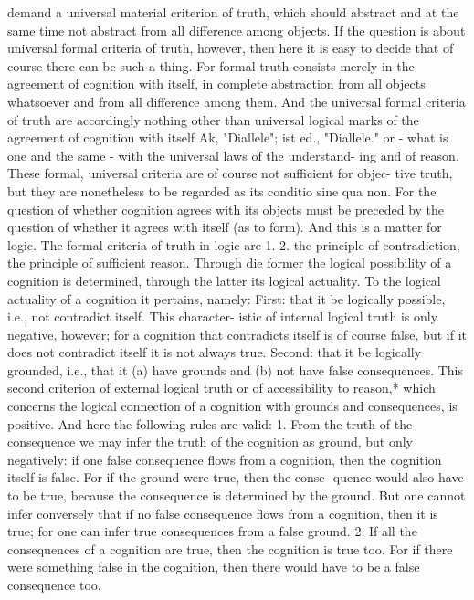 demand a universal material criterion of truth, which should abstract and
at the same time not abstract from all difference among objects.
If the question is about universal formal criteria of truth, however, then
here it is easy to decide that of course there can be such a thing. For formal
truth consists merely in the agreement of cognition with itself, in complete
abstraction from all objects whatsoever and from all difference among
them. And the universal formal criteria of truth are accordingly nothing
other than universal logical marks of the agreement of cognition with itself
Ak, "Diallele"; ist ed., "Diallele."
or - what is one and the same - with the universal laws of the understand-
ing and of reason.
These formal, universal criteria are of course not sufficient for objec-
tive truth, but they are nonetheless to be regarded as its conditio sine qua
non.
For the question of whether cognition agrees with its objects must be
preceded by the question of whether it agrees with itself (as to form). And
this is a matter for logic.
The formal criteria of truth in logic are
1.
2.
the principle of contradiction,
the principle of sufficient reason.
Through die former the logical possibility of a cognition is determined,
through the latter its logical actuality.
To the logical actuality of a cognition it pertains, namely:
First: that it be logically possible, i.e., not contradict itself. This character-
istic of internal logical truth is only negative, however; for a cognition that
contradicts itself is of course false, but if it does not contradict itself it is
not always true.
Second: that it be logically grounded, i.e., that it (a) have grounds and (b)
not have false consequences.
This second criterion of external logical truth or of accessibility to reason,*
which concerns the logical connection of a cognition with grounds and
consequences, is positive. And here the following rules are valid:
1.
From the truth of the consequence we may infer the truth of the cognition as
ground, but only negatively: if one false consequence flows from a cognition,
then the cognition itself is false. For if the ground were true, then the conse-
quence would also have to be true, because the consequence is determined by
the ground.
But one cannot infer conversely that if no false consequence flows from
a cognition, then it is true; for one can infer true consequences from a
false ground.
2.
If all the consequences of a cognition are true, then the cognition is true too. For if
there were something false in the cognition, then there would have to be a
false consequence too.
